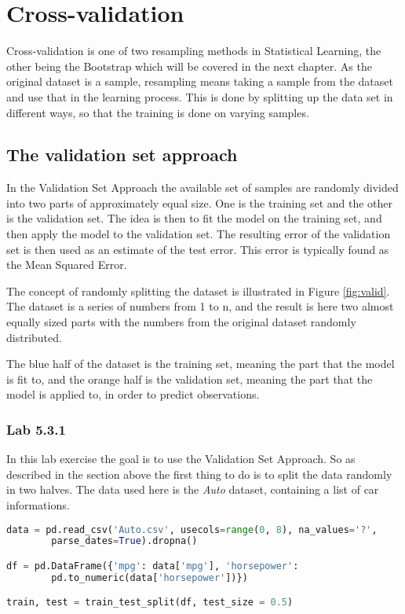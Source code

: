 \chapter{Cross-validation}
\label{chp:crossval}
Cross-validation is one of two resampling methods in Statistical Learning, the other being the Bootstrap which will be covered in the next chapter. As the original dataset is a sample, resampling means taking a sample from the dataset and use that in the learning process. This is done by splitting up the data set in different ways, so that the training is done on varying samples. 


\section{The validation set approach}
\label{sec:VSA}
In the Validation Set Approach the available set of samples are randomly divided into two parts of approximately equal size. One is the training set and the other is the validation set. The idea is then to fit the model on the training set, and then apply the model to the validation set. The resulting error of the validation set is then used as an estimate of the test error. This error is typically found as the Mean Squared Error. 


The concept of randomly splitting the dataset is illustrated in Figure \ref{fig:valid}. The dataset is a series of numbers from 1 to n, and the result is here two almost equally sized parts with the numbers from the original dataset randomly distributed. 

The blue half of the dataset is the training set, meaning the part that the model is fit to, and the orange half is the validation set, meaning the part that the model is applied to, in order to predict observations. 

\subsection{Lab 5.3.1}
In this lab exercise the goal is to use the Validation Set Approach. So as described in the section above the first thing to do is to split the data randomly in two halves. The data used here is the \emph{Auto} dataset, containing a list of car informations. 

\begin{lstlisting}[language=Python, label=lst:lst_valid, caption=Auto dataset randomly split]
data = pd.read_csv('Auto.csv', usecols=range(0, 8), na_values='?',
		parse_dates=True).dropna()

df = pd.DataFrame({'mpg': data['mpg'], 'horsepower':  
		pd.to_numeric(data['horsepower'])})

train, test = train_test_split(df, test_size = 0.5)
\end{lstlisting}

